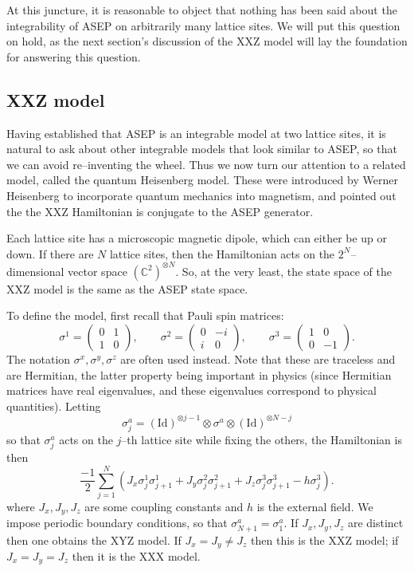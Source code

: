 \documentclass{ximera}
\begin{document}
At this juncture, it is reasonable to object that nothing has been said about the integrability of ASEP
on arbitrarily many lattice sites. We will put this question on hold, as the next section's discussion
of the XXZ model will lay the foundation for answering this question.

\subsection{XXZ model}
Having established that ASEP is an integrable model at two lattice sites, it is natural to ask about
other integrable models that look similar to ASEP, so that we can avoid re--inventing the wheel. Thus we 
now turn our attention to a related model, called the quantum Heisenberg model. These were introduced
by Werner Heisenberg \cite{Hei28} to incorporate quantum mechanics into magnetism, and \cite{GS92,ADHR94}
pointed out the the XXZ Hamiltonian is conjugate to the ASEP generator. 

Each lattice site has a microscopic
magnetic dipole, which can either be up or down. If there are \(N\) lattice sites, 
then the Hamiltonian acts on the \(2^N\)--dimensional vector space \((\mathbb{C}^2)^{\otimes N}.\)
So, at the very least, the state space of the XXZ model is the same as the ASEP state space. 

To define the model, first recall that Pauli spin matrices:
\[
\sigma^1 = \left(\begin{array}{cc} 0 & 1 \\ 1 & 0 \end{array}\right), \quad \quad \sigma^2 = \left( \begin{array}{cc} 0 & -i \\ i & 0 \end{array}\right), \quad \quad \sigma^3 = \left( \begin{array}{cc} 1 & 0 \\ 0 & -1 \end{array}\right).
\]
The notation \(\sigma^x,\sigma^y,\sigma^z\) are often used instead. 
Note that these are traceless and are Hermitian, the latter property being important in physics (since
Hermitian matrices have real eigenvalues, and these eigenvalues correspond to physical quantities). 
Letting
\[
\sigma^a_j = (\mathrm{Id})^{\otimes j-1} \otimes \sigma^a \otimes (\mathrm{Id})^{\otimes N-j}
\] 
so that \(\sigma^a_j\) acts on the \(j\)--th lattice site while fixing the others, the Hamiltonian is then
\[
\frac{-1}{2}\sum_{j=1}^N \left( J_x \sigma^1_j \sigma^1_{j+1} + J_y \sigma^2_j \sigma^2_{j+1} + J_z \sigma^3_j\sigma^3_{j+1} - h\sigma^3_j\right).
\]
where \(J_x,J_y,J_z\) are some coupling constants and \(h\) is the external field. We impose periodic boundary
conditions, so that \(\sigma^a_{N+1}=\sigma^a_1.\) If \(J_x,J_y,J_z\) are distinct then one obtains the 
XYZ model. If \(J_x=J_y \neq J_z\) then this is the XXZ model; if \(J_x=J_y=J_z\) then it is the XXX model.
\end{document}
